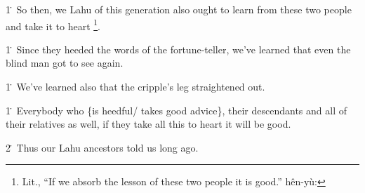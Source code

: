 1\. So then, we Lahu of this generation also ought to learn from these two people
and take it to heart \footnote{Lit., ``If we absorb the lesson of these two people it is good.'' hên-yù:}.

1\. Since they heeded the words of the fortune-teller, we've learned that even
the blind man got to see again.

1\. We've learned also that the cripple's leg straightened out.

1\. Everybody who \{is heedful/ takes good advice\}, their descendants and all
of their relatives as well, if they take all this to heart it will be good.

2\. Thus our Lahu ancestors told us long ago.


